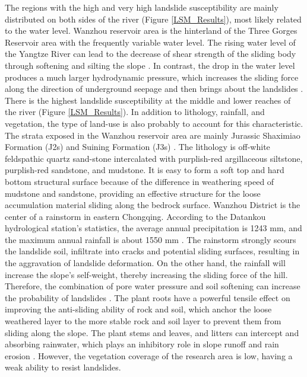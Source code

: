 \documentclass[a4paper,fleqn]{cas-sc}
\begin{document}
The regions with the high and very high landslide susceptibility are mainly distributed on both sides of the river (Figure \ref{LSM_Results}), most likely related to the water level. 
Wanzhou reservoir area is the hinterland of the Three Gorges Reservoir area with the frequently variable water level. 
The rising water level of the Yangtze River can lead to the decrease of shear strength of the sliding body through softening and silting the slope \citep{Wang2013,Gui2016}. 
In contrast, the drop in the water level produces a much larger hydrodynamic pressure, which increases the sliding force along the direction of underground seepage and then brings about the landslides \citep{Wang2013,Gui2016}. 
There is the highest landslide susceptibility at the middle and lower reaches of the river (Figure \ref{LSM_Results}). 
In addition to lithology, rainfall, and vegetation, the type of land-use is also probably to account for this characteristic. 
The strata exposed in the Wanzhou reservoir area are mainly Jurassic Shaximiao Formation (J2s) and Suining Formation (J3s) \citep{Zhu2014AnLSM_fuzzy_logic}. 
The lithology is off-white feldspathic quartz sand-stone intercalated with purplish-red argillaceous siltstone, purplish-red sandstone, and mudstone. 
It is easy to form a soft top and hard bottom structural surface because of the difference in weathering speed of mudstone and sandstone, providing an effective structure for the loose accumulation material sliding along the bedrock surface. 
Wanzhou District is the center of a rainstorm in eastern Chongqing. 
According to the Datankou hydrological station's statistics, the average annual precipitation is 1243 mm, and the maximum annual rainfall is about 1550 mm \citep{Yu2016IJERPH,Song2018}. 
The rainstorm strongly scours the landslide soil, infiltrate into cracks and potential sliding surfaces, resulting in the aggravation of landslide deformation. 
On the other hand, the rainfall will increase the slope's self-weight, thereby increasing the sliding force of the hill. 
Therefore, the combination of pore water pressure and soil softening can increase the probability of landslides \citep{Finlay1997,Dahal2007}. 
The plant roots have a powerful tensile effect on improving the anti-sliding ability of rock and soil, which anchor the loose weathered layer to the more stable rock and soil layer to prevent them from sliding along the slope. 
The plant stems and leaves, and litters can intercept and absorbing rainwater, which plays an inhibitory role in slope runoff and rain erosion \citep{Sittadewi2019}. 
However, the vegetation coverage of the research area is low, having a weak ability to resist landslides. 
\end{document}
